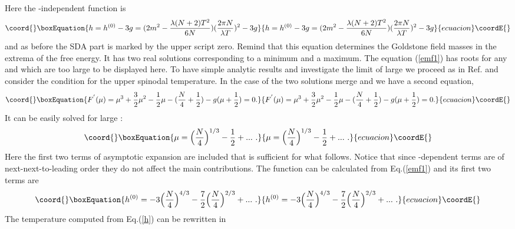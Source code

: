 \documentclass[a4paper,12pt]{article}
\begin{document}
Here the \myHighlight{$\mu$}\coordHE{}-independent function is
\begin{equation}\coord{}\boxEquation{ \label{h}
h = h^{(0)} - 3 g = (2 m^2 - \frac{\lambda (N + 2) T^2}{6 N} )(\frac{2\pi
  N}{\lambda T})^2 - 3 g
}{ h = h^{(0)} - 3 g = (2 m^2 - \frac{\lambda (N + 2) T^2}{6 N} )(\frac{2\pi
  N}{\lambda T})^2 - 3 g
}{ecuacion}\coordE{}\end{equation}
and as before the SDA part is marked by the upper script zero. Remind
that this equation determines the Goldstone field masses in the
extrema of the free energy. It has two real solutions corresponding to
a minimum and a maximum. The equation (\ref{emf1}) has roots for any
\coordHE{} and \coordHE{} which are too large to be displayed here. To have simple
analytic results and investigate the limit of large \coordHE{} we proceed as
in Ref.\cite{pl} and consider the condition for the upper spinodal
temperature. In the case of \coordHE{} the two solutions merge and we
have a second equation,
\begin{equation}\coord{}\boxEquation{ \label{f'}
F^{'}(\mu) = \mu^3 + \frac{3}{2} \mu^2 - \frac{1}{2} \mu -
(\frac{N}{4} + \frac{1}{2}) - g( \mu + \frac{1}{2}) = 0. 
}{ F^{'}(\mu) = \mu^3 + \frac{3}{2} \mu^2 - \frac{1}{2} \mu -
(\frac{N}{4} + \frac{1}{2}) - g( \mu + \frac{1}{2}) = 0. 
}{ecuacion}\coordE{}\end{equation}
It can be easily solved for large \coordHE{}: 
\begin{equation}\coord{}\boxEquation{ \label{sol}
\mu = \Bigl(\frac{N}{4}\Bigr)^{1/3} - \frac{1}{2} + ...~.
}{ \mu = \Bigl(\frac{N}{4}\Bigr)^{1/3} - \frac{1}{2} + ...~.
}{ecuacion}\coordE{}\end{equation} 
Here the first two terms of asymptotic expansion are included that is
sufficient for what follows. Notice that since \coordHE{}-dependent terms are
of next-next-to-leading order they do not affect the main contributions.
The function \coordHE{} can be calculated from Eq.(\ref{emf1}) and its first
two terms are
\begin{equation}\coord{}\boxEquation{ \label{s0lh}
 h^{(0)} = - 3 \Bigl(\frac{N}{4}\Bigr)^{4/3} - \frac{7}{2} \Bigl( \frac{N}{4}\Bigr)^{2/3}  + ...~.
}{ h^{(0)} = - 3 \Bigl(\frac{N}{4}\Bigr)^{4/3} - \frac{7}{2} \Bigl( \frac{N}{4}\Bigr)^{2/3}  + ...~.
}{ecuacion}\coordE{}\end{equation}
The temperature \coordHE{} computed from Eq.(\ref{h}) can be rewritten in
\end{document}
